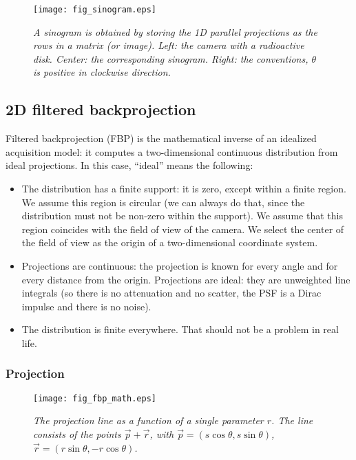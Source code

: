 \begin{figure}[tb]
\centering
\texttt{[image: fig\_sinogram.eps]}
\caption{\label{fig:sinogram} \emph{A sinogram is obtained by storing the 1D
parallel projections as the rows in a matrix (or image). Left: the camera with
a radioactive disk. Center: the corresponding sinogram. Right: the
conventions, $\theta$ is positive in clockwise direction.}}
\end{figure}

\subsection{2D filtered backprojection}
Filtered backprojection (FBP) is the mathematical inverse of an idealized
acquisition model: it computes a two-dimensional continuous distribution from
ideal projections. In this case, ``ideal'' means the following:
\begin{itemize}
\item
The distribution has a finite support: it is zero, except within a finite
region.  We assume this region is circular (we can always do that, since the
distribution must not be non-zero within the support). We assume that this
region coincides with the field of view of the camera. We select the center of
the field of view as the origin of a two-dimensional coordinate system.

\item
Projections are continuous: the projection is known for every angle and for
every distance from the origin. Projections are ideal: they are unweighted
line integrals (so there is no attenuation and no scatter, the PSF is a Dirac
impulse and there is no noise).

\item
The distribution is finite everywhere. That should not be a problem in real
life.

\end{itemize}

\subsubsection{Projection}
\begin{figure}[tb]
\centering
\texttt{[image: fig\_fbp\_math.eps]}
\caption{\label{fig:fbp_math} \emph{The projection line as a function of a
single parameter $r$. The line consists of the points $\vec{p} + \vec{r}$,
with $\vec{p} = (s \cos \theta, s \sin \theta)$, $\vec{r} = (r \sin \theta, - r
\cos \theta)$.}}
\end{figure}

